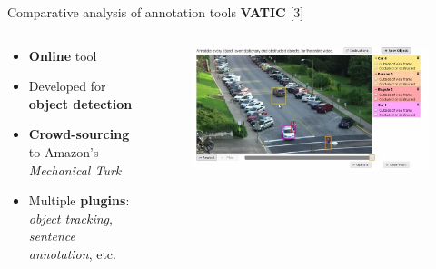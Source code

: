 \documentclass{beamer}
\begin{document}
\begin{tframe}{Comparative analysis of annotation tools}
\textbf{VATIC} [3] 
\begin{columns}[t] %
\begin{column}{.45\textwidth}
\begin{itemize}
\item \textbf{Online} tool
\vspace{0.1cm}
\item Developed for \textbf{object detection}
\vspace{0.1cm}
\item \textbf{Crowd-sourcing} to Amazon's \emph{Mechanical Turk}
\vspace{0.1cm}
\item Multiple \textbf{plugins}: \emph{object tracking}, \emph{sentence annotation}, etc.
\end{itemize}
\end{column}%
\begin{column}{.3\textwidth}
\begin{figure}[h]
\centering
\includegraphics[width=1.2\textwidth]{images/vatic.jpg}
\end{figure}
\end{column}%
\end{columns}
\end{tframe}
\end{document}
